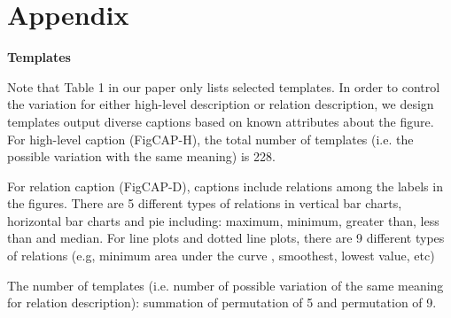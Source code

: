 \documentclass[11pt,a4paper]{article}
\begin{document}
\appendix

\section{Appendix}
\label{sec:appendix}

\textbf{Templates}

Note that Table 1 in our paper only lists selected templates. In order to control the variation for either high-level description or relation description, we design templates output diverse captions based on known attributes about the figure.
For high-level caption (FigCAP-H), the total number of templates (i.e. the possible variation with the same meaning) is 228.

For relation caption (FigCAP-D), captions include relations among the labels in the figures. There are 5 different types of relations in vertical bar charts, horizontal bar charts and pie including: maximum, minimum, greater than, less than and median. For line plots and dotted line plots, there are 9 different types of relations (e.g, minimum area under the curve , smoothest, lowest value, etc) 

The number of templates (i.e. number of possible variation of the same meaning for relation description): summation of permutation of 5 and permutation of 9.
\end{document}
